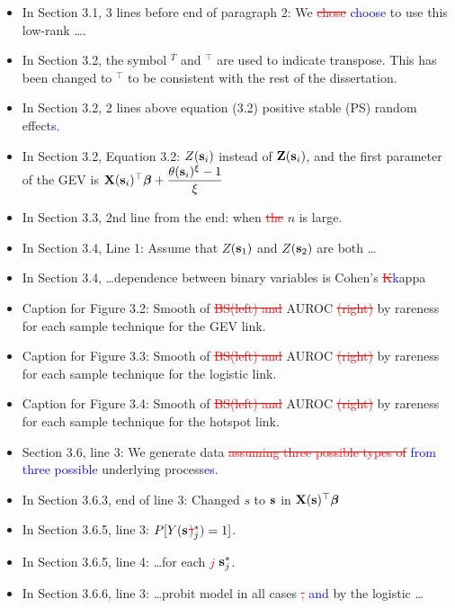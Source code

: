\documentclass[11pt]{article}
\begin{document}
\begin{itemize}
  \item In Section 3.1, 3 lines before end of paragraph 2: We \textcolor{red}{\st{chose}} \textcolor{blue}{choose} to use this low-rank \ldots.
  \item In Section 3.2, the symbol $^T$ and $^\top$ are used to indicate transpose. This has been changed to $^\top$ to be consistent with the rest of the dissertation.
  \item In Section 3.2, 2 lines above equation (3.2) positive stable (PS) random effect\textcolor{blue}{s}.
  \item In Section 3.2, Equation 3.2: $Z(\mathbf{s}_i)$ instead of $\mathbf{Z}(\mathbf{s}_i)$, and the first parameter of the GEV is $\mathbf{X}(\mathbf{s}_i)^\top\mbox{\boldmath $\beta$} + \displaystyle \frac{\theta(\mathbf{s}_i)^\xi - 1}{\xi}$
  \item In Section 3.3, 2nd line from the end: when \textcolor{red}{\st{the}} $n$ is large.
  \item In Section 3.4, Line 1: Assume that $Z$\textcolor{blue}{$(\mathbf{s}_1)$} and $Z$\textcolor{blue}{$(\mathbf{s}_2)$} are both \ldots
  \item In Section 3.4, \ldots dependence between binary variables is Cohen's \textcolor{red}{\st{K}}\textcolor{blue}{k}appa
  \item Caption for Figure 3.2: Smooth of \textcolor{red}{\st{BS(left) and}} AUROC \textcolor{red}{\st{(right)}} by rareness for each sample technique for the GEV link.
  \item Caption for Figure 3.3: Smooth of \textcolor{red}{\st{BS(left) and}} AUROC \textcolor{red}{\st{(right)}} by rareness for each sample technique for the logistic link.
  \item Caption for Figure 3.4: Smooth of \textcolor{red}{\st{BS(left) and}} AUROC \textcolor{red}{\st{(right)}} by rareness for each sample technique for the hotspot link.
  \item Section 3.6, line 3: We generate data \textcolor{red}{\st{assuming three possible types of}} \textcolor{blue}{from three possible} underlying process\textcolor{blue}{es}.
  \item In Section 3.6.3, end of line 3: Changed $s$ to $\mathbf{s}$ in $\mathbf{X}(\mathbf{s})^\top \mbox{\boldmath $\beta$}$
  \item In Section 3.6.5, line 3: $P[Y(\mathbf{s}$\textcolor{red}{\st{)}}$^*_j\textcolor{blue}{)} = 1]$.
  \item In Section 3.6.5, line 4: \ldots for each \textcolor{red}{\st{$j$}} \textcolor{blue}{$\mathbf{s}^*_j$}.
  \item In Section 3.6.6, line 3: \ldots probit model in all cases \textcolor{red}{\st{,}} \textcolor{blue}{and} by the logistic \ldots
\end{itemize}
\end{document}
